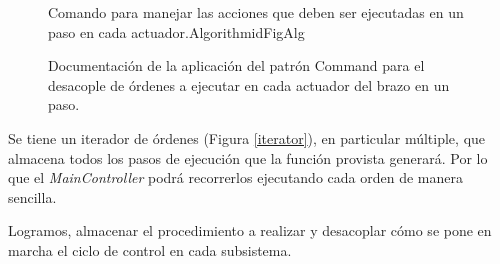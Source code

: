 \begin{figure}[h]
\caption{Documentación de la aplicación del patrón Command para el desacople de órdenes a ejecutar en cada actuador del brazo en un paso.}
\label{docCommandSteps}
\begin{pattern}[]{Comando para manejar las acciones que deben ser ejecutadas en un paso en cada actuador.}{Algorithm}{idFigAlg}
\assigns
{}

\end{pattern}
\end{figure}


Se tiene un iterador de órdenes (Figura \ref{iterator}), en particular múltiple, que almacena todos los pasos de ejecución que la función provista generará. Por lo que el \textit{MainController} podrá recorrerlos ejecutando cada orden de manera sencilla. 

Logramos, almacenar el procedimiento a realizar y desacoplar cómo se pone en marcha el ciclo de control en cada subsistema.

